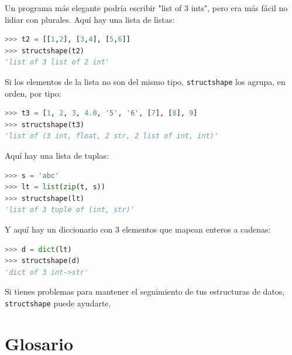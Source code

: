 Un programa más elegante podría escribir "list of 3 ints", pero era más fácil no lidiar con plurales. Aquí hay una lista de listas:

\begin{lstlisting}[language=Python]
>>> t2 = [[1,2], [3,4], [5,6]]
>>> structshape(t2)
'list of 3 list of 2 int'
\end{lstlisting}

Si los elementos de la lista no son del mismo tipo, \texttt{structshape} los agrupa, en orden, por tipo:

\begin{lstlisting}[language=Python]
>>> t3 = [1, 2, 3, 4.0, '5', '6', [7], [8], 9]
>>> structshape(t3)
'list of (3 int, float, 2 str, 2 list of int, int)'
\end{lstlisting}

Aquí hay una lista de tuplas:

\begin{lstlisting}[language=Python]
>>> s = 'abc'
>>> lt = list(zip(t, s))
>>> structshape(lt)
'list of 3 tuple of (int, str)'
\end{lstlisting}

Y aquí hay un diccionario con 3 elementos que mapean enteros a cadenas:

\begin{lstlisting}[language=Python]
>>> d = dict(lt)
>>> structshape(d)
'dict of 3 int->str'
\end{lstlisting}

Si tienes problemas para mantener el seguimiento de tus estructuras de datos, \texttt{structshape} puede ayudarte.

\section{Glosario}

